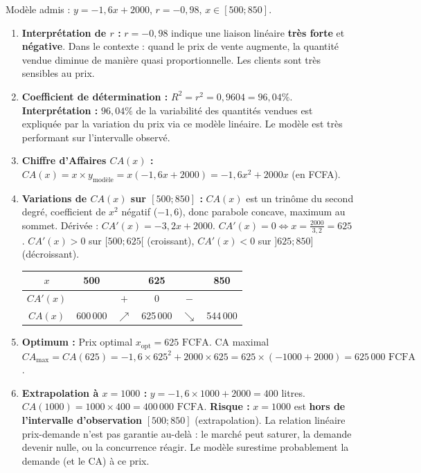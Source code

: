 \documentclass[11pt]{article}
\begin{document}
\begin{corrige}
Modèle admis : $y = -1,6x + 2000$, $r = -0,98$, $x \in [500; 850]$.

\begin{enumerate}
\item \textbf{Interprétation de $r$ :} $r = -0,98$ indique une liaison linéaire \textbf{très forte} et \textbf{négative}. Dans le contexte : quand le prix de vente augmente, la quantité vendue diminue de manière quasi proportionnelle. Les clients sont très sensibles au prix.

\item \textbf{Coefficient de détermination :} $R^2 = r^2 = 0,9604 = 96,04\%$.
\textbf{Interprétation :} $96,04\%$ de la variabilité des quantités vendues est expliquée par la variation du prix via ce modèle linéaire. Le modèle est très performant sur l'intervalle observé.

\item \textbf{Chiffre d'Affaires $CA(x)$ :}
$CA(x) = x \times y_{\text{modèle}} = x(-1,6x + 2000) = \boxed{-1,6x^2 + 2000x}$ (en FCFA).

\item \textbf{Variations de $CA(x)$ sur $[500; 850]$ :}
$CA(x)$ est un trinôme du second degré, coefficient de $x^2$ négatif ($-1,6$), donc parabole concave, maximum au sommet.
Dérivée : $CA'(x) = -3,2x + 2000$.
$CA'(x) = 0 \Leftrightarrow x = \frac{2000}{3,2} = 625$.
$CA'(x) > 0$ sur $[500; 625[$ (croissant), $CA'(x) < 0$ sur $]625; 850]$ (décroissant).
\begin{center}
\begin{tabular}{|c|ccccc|}\hline
$x$ & 500 & & 625 & & 850 \\ \hline
$CA'(x)$ & & $+$ & 0 & $-$ & \\ \hline
$CA(x)$ & 600\,000 & $\nearrow$ & 625\,000 & $\searrow$ & 544\,000 \\ \hline
\end{tabular}
\end{center}

\item \textbf{Optimum :} Prix optimal $x_{\text{opt}} = \boxed{625 \text{ FCFA}}$.
CA maximal $CA_{\text{max}} = CA(625) = -1,6 \times 625^2 + 2000 \times 625 = 625 \times (-1000 + 2000) = \boxed{625\,000 \text{ FCFA}}$.

\item \textbf{Extrapolation à $x=1000$ :}
$y = -1,6 \times 1000 + 2000 = 400$ litres.
$CA(1000) = 1000 \times 400 = 400\,000 \text{ FCFA}$.
\textbf{Risque :} $x=1000$ est \textbf{hors de l'intervalle d'observation} $[500; 850]$ (extrapolation). La relation linéaire prix-demande n'est pas garantie au-delà : le marché peut saturer, la demande devenir nulle, ou la concurrence réagir. Le modèle surestime probablement la demande (et le CA) à ce prix.


\end{enumerate}
\end{corrige}
\end{document}
